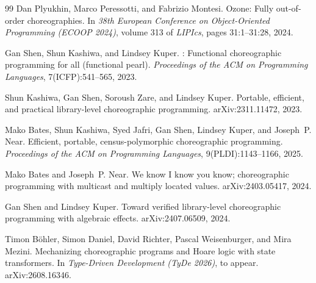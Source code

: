 \documentclass[11pt]{report}
\theoremstyle{plain}
\theoremstyle{definition}
\theoremstyle{remark}
\begin{document}
\begin{thebibliography}{99}
Dan Plyukhin, Marco Peressotti, and Fabrizio Montesi.
\newblock Ozone: Fully out-of-order choreographies.
\newblock In \emph{38th European Conference on Object-Oriented Programming
  (ECOOP 2024)}, volume 313 of \emph{LIPIcs}, pages 31:1--31:28, 2024.

Gan Shen, Shun Kashiwa, and Lindsey Kuper.
: Functional choreographic programming for all
  (functional pearl).
\newblock \emph{Proceedings of the ACM on Programming Languages},
  7(ICFP):541--565, 2023.

Shun Kashiwa, Gan Shen, Soroush Zare, and Lindsey Kuper.
\newblock Portable, efficient, and practical library-level choreographic
  programming.
\newblock arXiv:2311.11472, 2023.

Mako Bates, Shun Kashiwa, Syed Jafri, Gan Shen, Lindsey Kuper, and
  Joseph~P. Near.
\newblock Efficient, portable, census-polymorphic choreographic programming.
\newblock \emph{Proceedings of the ACM on Programming Languages},
  9(PLDI):1143--1166, 2025.

Mako Bates and Joseph~P. Near.
\newblock We know {I} know you know; choreographic programming with
  multicast and multiply located values.
\newblock arXiv:2403.05417, 2024.

Gan Shen and Lindsey Kuper.
\newblock Toward verified library-level choreographic programming with
  algebraic effects.
\newblock arXiv:2407.06509, 2024.

Timon B\"ohler, Simon Daniel, David Richter, Pascal Weisenburger, and Mira
  Mezini.
\newblock Mechanizing choreographic programs and {H}oare logic with state
  transformers.
\newblock In \emph{Type-Driven Development (TyDe 2026)}, to appear.
  arXiv:2608.16346.
\end{thebibliography}
\end{document}
